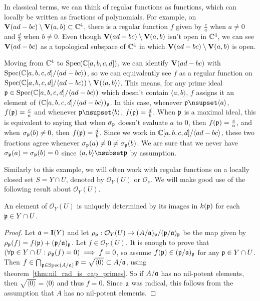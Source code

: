 \begin{example}\label{ex:reg_fun}\upshape
  In classical terms, we can think of regular functions as functions, which can locally be written as fractions of polynomials. For example, on $\operatorname{\mathbf V}(ad - bc) \setminus \operatorname{\mathbf V}(a, b) \subset \mathbb{C}^{4}$, there is a regular function $f$ given by $\frac c a$ when $a \neq 0$ and $\frac d b$ when $b \neq 0$. Even though $\operatorname{\mathbf V}(ad - bc) \setminus \operatorname{\mathbf V}(a, b)$ isn't open in $\mathbb{C}^{4}$, we can see $\operatorname{\mathbf V}(ad - bc)$ as a topological subspace of $\mathbb{C}^{4}$ in which $\operatorname{\mathbf V}(ad - bc) \setminus \operatorname{\mathbf V}(a, b)$ is open.

  Moving from $\mathbb{C}^{4}$ to $\operatorname{Spec}(\mathbb{C}[a, b, c, d])$, we can identify $\operatorname{\mathbf V}(ad - bc)$ with $\operatorname{Spec}(\mathbb{C}[a, b, c, d]/\langle ad - bc \rangle)$, so we can equivalently see $f$ as a regular function on $\operatorname{Spec}(\mathbb{C}[a, b, c, d]/\langle ad - bc \rangle) \setminus \operatorname{\mathbf V}(\langle a, b \rangle)$. This means, for any prime ideal $\mathfrak p \in \operatorname{Spec}(\mathbb{C}[a, b, c, d]/\langle ad - bc \rangle)$ which doesn't contain $\langle a, b \rangle$, $f$ assigns it an element of $(\mathbb{C}[a, b, c, d]/\langle ad - bc \rangle)_{\mathfrak p}$. In this case, whenever $\p \nsupset \langle a \rangle$, $f(\mathfrak p) = \frac c a$ and whenever $\p \nsupset \langle b \rangle$, $f(\mathfrak p) = \frac d b$. When $\mathfrak p$ is a maximal ideal, this is equivalent to saying that when $\sigma_{\mathfrak p}$ doesn't evaluate $a$ to 0, then $f(\mathfrak p) = \frac c a$, and when $\sigma_{\mathfrak p}(b) \neq 0$, then $f(\mathfrak p) = \frac d b$. Since we work in $\mathbb{C}[a, b, c, d]/\langle ad - bc \rangle$, these two fractions agree whenever $\sigma_{\mathfrak p}(a) \neq 0 \neq \sigma_{\mathfrak p}(b)$. We are sure that we never have $\sigma_{\mathfrak p}(a) = \sigma_{\mathfrak p}(b) = 0$ since $\langle a, b \rangle \nsubset \p$ by assumption.
\end{example}

Similarly to this example, we will often work with regular functions on a locally closed set $S = Y \cap U$, denoted by $\mathcal O_{Y}(U)$ or $\mathcal O_{s}$. We will make good use of the following result about $\mathcal O_{Y}(U)$.

\begin{lemma}\label{lem:O_Y_unique}
  An element of $\mathcal O_{Y}(U)$ is uniquely determined by its images in $k(\mathfrak p)$ for each $\mathfrak p \in Y \cap U$.
\end{lemma}
\begin{proof}
  Let $\mathfrak{a} = \operatorname{\mathbf I}(Y)$ and let $\rho_{\mathfrak p} : \mathcal O_{Y}(U) \to (A/\mathfrak{a})_{\mathfrak p}/(\mathfrak p/\mathfrak{a})_{\mathfrak p}$ be the map given by $\rho_{\mathfrak p}(f) = f(\mathfrak p) + (\mathfrak p/\mathfrak{a})_{\mathfrak p}$. Let $f \in \mathcal O_{Y}(U)$. It is enough to prove that $(\forall \mathfrak p \in Y \cap U: \rho_{\mathfrak p}(f) = 0) \implies f = 0$, so assume $f(\mathfrak p) \in (\mathfrak p/\mathfrak{a})_{\mathfrak p}$ for any $\mathfrak p \in Y \cap U$. Then $f \in \bigcap_{\mathfrak p \in \operatorname{Spec}(A/\mathfrak{a})} \mathfrak p = \sqrt{\langle 0 \rangle} \subset A/\mathfrak{a}$, using theorem~\ref{thm:nil_rad_is_cap_primes}. So if $A/\mathfrak{a}$ has no nil-potent elements, then $\sqrt{\langle 0 \rangle} = \langle 0 \rangle$ and thus $f = 0$. Since $\mathfrak{a}$ was radical, this follows from the assumption that $A$ has no nil-potent elements.
\end{proof}

